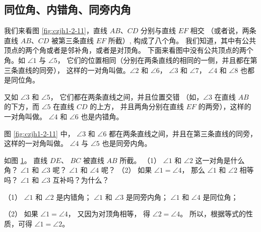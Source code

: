 \subsection{同位角、内错角、同旁内角}\label{subsec:czjh1-2-3}

我们来看图 \ref{fig:czjh1-2-11}，直线 $AB$、$CD$ 分别与直线 $EF$ 相交
（或者说，两条直线 $AB$、$CD$ 被第三条直线 $EF$ 所截）, 构成了八个角。
我们知道，其中有公共顶点的两个角或者是邻补角，或者是对顶角。
下面来看图中没有公共顶点的两个角。如 $\angle 1$ 与 $\angle 5$，
它们的位置相同（分别在两条直线的相同的一侧，并且都在第三条直线的同旁），
这样的一对角叫做。$\angle 2$ 和 $\angle 6$，
$\angle 3$ 和 $\angle 7$， $\angle 4$ 和 $\angle 8$ 也都是同位角。

又如 $\angle 3$ 和 $\angle 5$， 它们都在两条直线之间，并且位置交错
（如，$\angle 3$ 在直线 $AB$ 的下方，而 $\angle 5$ 在直线 $CD$ 的上方，
并且两角分别在直线 $EF$ 的两旁），这样的一对角叫做。
$\angle 4$ 和 $\angle 6$ 也是内错角。

图 \ref{fig:czjh1-2-11} 中， $\angle 3$ 和 $\angle 6$ 都在两条直线之间，并且在第三条直线的同旁，
这样的一对角叫做。 $\angle 4$ 与 $\angle 5$ 也是同旁内角。

\begin{figure}[htbp]
    \centering
    \begin{minipage}[b]{7cm}
        \centering
        
        \caption{}\label{fig:czjh1-2-11}
    \end{minipage}
    \qquad
    \begin{minipage}[b]{7cm}
        \centering
        
        \caption{}\label{fig:czjh1-2-12}
    \end{minipage}
\end{figure}

\liti[0] 
如图 \ref{fig:czjh1-2-12}。 直线 $DE$、 $BC$ 被直线 $AB$ 所截。
（1） $\angle 1$ 和 $\angle 2$ 这一对角是什么角？
    $\angle 1$ 和 $\angle 3$ 呢？
    $\angle 1$ 和 $\angle 4$ 呢？
（2） 如果 $\angle 1 = \angle 4$， 那么 $\angle 1$ 和 $\angle 2$ 相等吗？
    $\angle 1$ 和 $\angle 3$ 互补吗？为什么？

\jie （1） $\angle 1$ 和 $\angle 2$ 是内错角；
$\angle 1$ 和 $\angle 3$ 是同旁内角；
$\angle 1$ 和 $\angle 4$ 是同位角；

（2） 如果 $\angle 1 = \angle 4$， 又因为对顶角相等，
得 $\angle 2 = \angle 4$。
所以，根据等式的性质，可得 $\angle 1 = \angle 2$。

